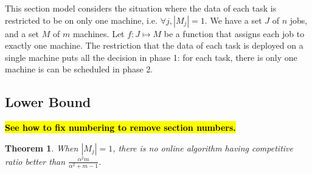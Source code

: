 \documentclass[10pt, conference, compsocconf]{IEEEtran}
\newtheorem{theorem}{Theorem}[section]
\newcommand{\todo}[1]{{\color{red}\textbf{\hl{#1}}\xspace}}
\begin{document}
This section model considers the situation where the data of each task
is restricted to be on only one machine, i.e. $\forall j, |M_j|=1$.
We have a set $J$ of $ n$ jobs, and a set $M$ of $m$ machines.  Let $f
: J \mapsto M$ be a function that assigns each job to exactly one
machine. The restriction that the data of each task is deployed on a
single machine puts all the decision in phase 1: for each task,
there is only one machine is can be scheduled in phase 2.

\subsection{Lower Bound}

\todo{See how to fix numbering to remove section numbers.}
\begin{theorem}
\label{th:model1-lb}
  When $|M_j| = 1$, there is no online algorithm having competitive
  ratio better than $\frac{\alpha^{2}m }{\alpha^{2} + m-1}$.
\end{theorem}
 
\end{document}
